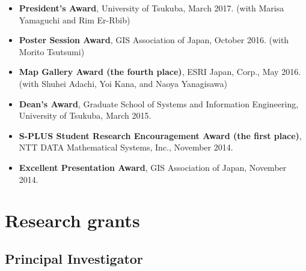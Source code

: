 \documentclass[
]{book}
\begin{document}
\begin{itemize}
\item
  \textbf{President's Award}, University of Tsukuba, March 2017.
  (with Marisa Yamaguchi and Rim Er-Rbib)
\item
  \textbf{Poster Session Award}, GIS Association of Japan, October 2016.
  (with Morito Tsutsumi)
\item
  \textbf{Map Gallery Award (the fourth place)}, ESRI Japan, Corp., May 2016.
  (with Shuhei Adachi, Yoi Kana, and Naoya Yanagisawa)
\item
  \textbf{Dean's Award}, Graduate School of Systems and Information Engineering, University of Tsukuba, March 2015.
\item
  \textbf{S-PLUS Student Research Encouragement Award (the first place)}, NTT DATA Mathematical Systems, Inc., November 2014.
\item
  \textbf{Excellent Presentation Award}, GIS Association of Japan, November 2014.
\end{itemize}

\section*{Research grants}\label{research-grants}

\subsection*{Principal Investigator}\label{principal-investigator}
\end{document}
